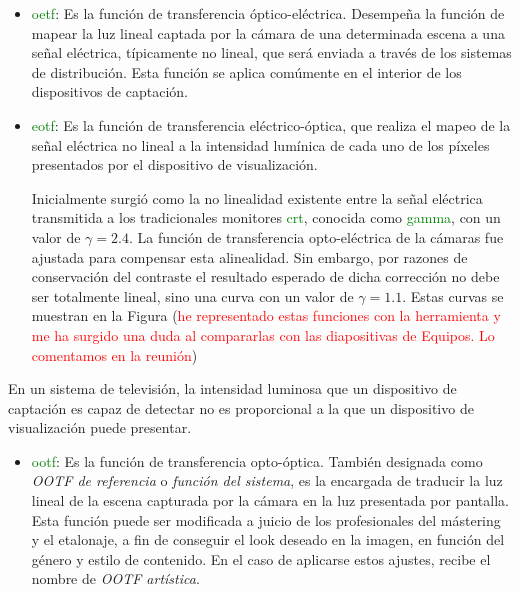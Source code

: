 \documentclass[a4paper, 12pt]{report}
\begin{document}
\begin{itemize}
  \item  \textcolor{green}{oetf}: Es la función de transferencia óptico-eléctrica. Desempeña la función de mapear la luz lineal captada por la cámara de una determinada escena a una señal eléctrica, típicamente no lineal, que será enviada a través de los sistemas de distribución. Esta función se aplica comúmente en el interior de los dispositivos de captación.
  \item \textcolor{green}{eotf}: Es la función de transferencia eléctrico-óptica, que realiza el mapeo de la señal eléctrica no lineal a la intensidad lumínica de cada uno de los píxeles presentados por el dispositivo de visualización.
  
  Inicialmente surgió como la no linealidad existente entre la señal eléctrica transmitida a los tradicionales monitores \textcolor{green}{crt}, conocida como \textcolor{green}{gamma}, con un valor de $\gamma = 2.4$. La función de transferencia opto-eléctrica de la cámaras fue ajustada para compensar esta alinealidad.
  Sin embargo, por razones de conservación del contraste el resultado esperado de dicha corrección no debe ser totalmente lineal, sino una curva con un valor de $\gamma = 1.1$. Estas curvas se muestran en la Figura (\textcolor{red}{he representado estas funciones con la herramienta y me ha surgido una duda al compararlas con las diapositivas de Equipos. Lo comentamos en la reunión})
\end{itemize}
En un sistema de televisión, la intensidad luminosa que un dispositivo de captación es capaz de detectar  no es proporcional a la que un dispositivo de visualización puede presentar.

\begin{itemize}
  \item  \textcolor{green}{ootf}:  Es la función de transferencia opto-óptica. También designada como \textit{OOTF de referencia} o  \textit{función del sistema}, es la encargada de traducir la luz lineal de la escena capturada por la cámara en la luz presentada por pantalla.
    Esta función puede ser modificada a juicio de los profesionales del mástering y el etalonaje, a fin de conseguir el look deseado en la imagen, en función del género y estilo de contenido. En el caso de aplicarse estos ajustes, recibe el nombre de \textit{OOTF artística}.

\end{itemize}
\end{document}

